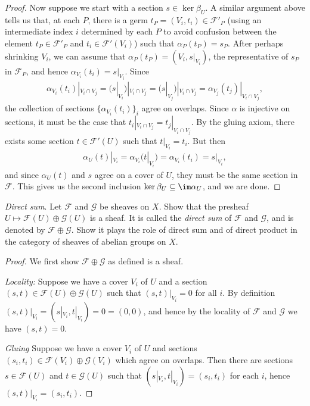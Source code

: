 \begin{problemset}
\begin{proof}
		Now suppose we start with a section $s\in \ker\beta_U$. A similar argument above tells us that, at each $P$, there is a germ $t_P = (V_i, t_i) \in \mathcal F'_P$ (using an intermediate index $i$ determined by each $P$ to avoid confusion between the element $t_P \in \mathcal F'_P$ and $t_i \in \mathcal F'(V_i)$) such that $\alpha_P(t_P) = s_P$. After perhaps shrinking $V_i$, we can assume that $\alpha_P(t_P) = (V_i, s|_{V_i})$, the representative of $s_P$ in $\mathcal F_P$, and hence $\alpha_{V_i}(t_i) = s|_{V_i}$. Since
		\begin{align*}
			\alpha_{V_i}(t_i)|_{V_i\cap V_j} = (s|_{V_i})|_{V_i\cap V_j} = (s|_{V_j})|_{V_i\cap V_j} = \alpha_{V_j}(t_j)|_{V_i\cap V_j},
		\end{align*}
		the collection of sections $\{\alpha_{V_i}(t_i)\}_{i}$ agree on overlaps. Since $\alpha$ is injective on sections, it must be the case that $t_i|_{V_i \cap V_j} = t_j|_{V_i\cap V_j}$. By the gluing axiom, there exists some section $t\in \mathcal F'(U)$ such that $t|_{V_i} = t_i$. But then
		\begin{align*}
			\alpha_U(t)|_{V_i} = \alpha_{V_i}(t|_{V_i}) = \alpha_{V_i}(t_i) = s|_{V_i},
		\end{align*}
		and since $\alpha_U(t)$ and $s$ agree on a cover of $U$, they must be the same section in $\mathcal F$. This gives us the second inclusion $\ker\beta_U\subseteq \im\alpha_U$, and we are done.
	\end{proof}
\item \emph{Direct sum}. Let $\mathcal F$ and $\mathcal G$ be sheaves on $X$. Show that the presheaf $U\mapsto \mathcal F(U)\oplus \mathcal G(U)$ is a sheaf. It is called the \emph{direct sum} of $\mathcal F$ and $\mathcal G$, and is denoted by $\mathcal F\oplus \mathcal G$. Show it plays the role of direct sum and of direct product in the category of sheaves of abelian groups on $X$.
\begin{proof}
	We first show $\mathcal F\oplus \mathcal G$ as defined is a sheaf.

\emph{Locality:} Suppose we have a cover $V_i$ of $U$ and a section $(s,t) \in \mathcal F(U)\oplus \mathcal G(U)$ such that $(s,t)|_{V_i} = 0$ for all $i$. By definition $(s,t)|_{V_i} = (s|_{V_i}, t|_{V_i}) = 0 = (0,0)$, and hence by the locality of $\mathcal F$ and $\mathcal G$ we have $(s,t) = 0$.

\emph{Gluing} Suppose we have a cover $V_i$ of $U$ and sections $(s_i,t_i) \in \mathcal F(V_i)\oplus \mathcal G(V_i)$ which agree on overlaps. Then there are sections $s \in \mathcal F(U)$ and $t\in \mathcal G(U)$ such that $(s|_{V_i}, t|_{V_i}) = (s_i,t_i)$ for each $i$, hence $(s,t)|_{V_i} = (s_i,t_i)$. 


\end{proof}
\end{problemset}
